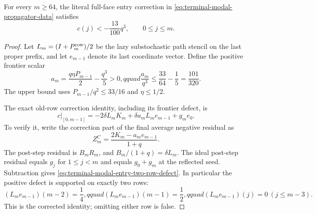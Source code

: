 \begin{lemma}
\label{lem:terminal-modal-entry-correction-margin}
For every $m\ge64$, the literal full-face entry correction in
\eqref{eq:terminal-modal-propagator-data} satisfies
\begin{equation}
 c(j)<-\frac{13}{100}q^3,\qquad0\le j\le m.
 \label{eq:terminal-modal-entry-correction-margin}
\end{equation}
\end{lemma}

\begin{proof}
Let $L_m=(I+P_m^{\rm row})/2$ be the lazy substochastic path stencil on the
last proper prefix, and let $e_{m-1}$ denote its last coordinate vector.
Define the positive frontier scalar
\begin{equation}
 a_m=\frac{q\eta P_{m-1}}2-\frac{q^3}{5}>0,qquad
 \frac{a_m}{q^3}\le\frac{33}{64}-\frac15=\frac{101}{320}.
 \label{eq:terminal-modal-entry-frontier-defect-scalar}
\end{equation}
The upper bound uses $P_{m-1}/q^2\le33/16$ and $\eta\le1/2$.

The exact old-row correction identity, including its frontier defect, is
\begin{equation}
 c|_{[0,m-1]}
 =-2\delta L_mK_m+\delta a_mL_me_{m-1}+g_m e_0.
 \label{eq:terminal-modal-entry-two-row-defect}
\end{equation}
To verify it, write the correction part of the final average negative
residual as
\[
 Z_m^C=\frac{2K_m-a_me_{m-1}}{1+q}.
\]
The post-step residual is $B_mR_m$, and
$B_m/(1+q)=\delta L_m$.  The ideal post-step residual equals $g_j$ for
$1\le j<m$ and equals $g_0+g_m$ at the reflected seed.  Subtraction gives
\eqref{eq:terminal-modal-entry-two-row-defect}.  In particular the positive
defect is supported on exactly two rows:
\begin{equation}
 (L_me_{m-1})(m-2)=\frac14,qquad
 (L_me_{m-1})(m-1)=\frac12,qquad
 (L_me_{m-1})(j)=0\ (j\le m-3).
 \label{eq:terminal-modal-entry-two-row-support}
\end{equation}
This is the corrected identity; omitting either row is false.


\end{proof}
